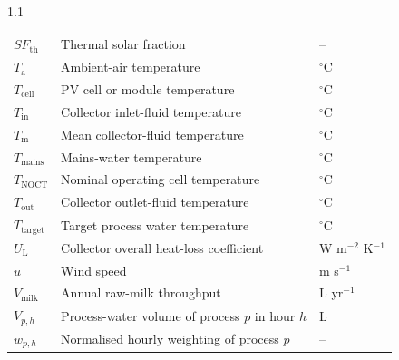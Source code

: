 \documentclass[12pt,letterpaper]{article}
\begin{document}
\begin{spacing}{1.1}
\begin{longtable}{@{}p{2.0cm} p{9.6cm} p{2.3cm}@{}}
$SF_{\mathrm{th}}$ & Thermal solar fraction & -- \\
$T_{\mathrm{a}}$ & Ambient-air temperature & $^\circ$C \\
$T_{\mathrm{cell}}$ & PV cell or module temperature & $^\circ$C \\
$T_{\mathrm{in}}$ & Collector inlet-fluid temperature & $^\circ$C \\
$T_{\mathrm{m}}$ & Mean collector-fluid temperature & $^\circ$C \\
$T_{\mathrm{mains}}$ & Mains-water temperature & $^\circ$C \\
$T_{\mathrm{NOCT}}$ & Nominal operating cell temperature & $^\circ$C \\
$T_{\mathrm{out}}$ & Collector outlet-fluid temperature & $^\circ$C \\
$T_{\mathrm{target}}$ & Target process water temperature & $^\circ$C \\
$U_{\mathrm{L}}$ & Collector overall heat-loss coefficient & W m$^{-2}$ K$^{-1}$ \\
$u$ & Wind speed & m s$^{-1}$ \\
$V_{\mathrm{milk}}$ & Annual raw-milk throughput & L yr$^{-1}$ \\
$V_{p,h}$ & Process-water volume of process $p$ in hour $h$ & L \\
$w_{p,h}$ & Normalised hourly weighting of process $p$ & -- \\
\bottomrule
\end{longtable}


\end{spacing}
\end{document}
